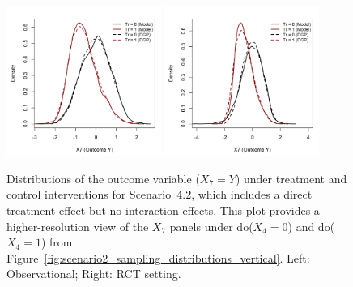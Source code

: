 \begin{figure}[htbp]
\centering
\includegraphics[width=0.45\textwidth]{img/results/observ_scenario2_X7_treatment_densities.png}
\includegraphics[width=0.45\textwidth]{img/results/rct_scenario2_X7_treatment_densities.png}
\caption{Distributions of the outcome variable ($X_7=Y$) under treatment and control interventions for Scenario~4.2, which includes a direct treatment effect but no interaction effects. This plot provides a higher-resolution view of the $X_7$ panels under do($X_4 = 0$) and do($X_4 = 1$) from Figure~\ref{fig:scenario2_sampling_distributions_vertical}. Left: Observational; Right: RCT setting.}
\label{fig:scenario2_outcome_distributions}
\end{figure}






